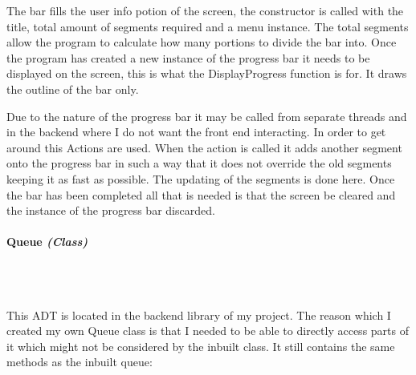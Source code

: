 \begin{FlushLeft}
    The bar fills the user info potion of the screen, the constructor is called with the title, total amount of segments required and a menu instance. The total segments allow the program to calculate how many portions to divide the bar into. Once the program has created a new instance of the progress bar it needs to be displayed on the screen, this is what the DisplayProgress function is for. It draws the outline of the bar only. \\ \bk

    Due to the nature of the progress bar it may be called from separate threads and in the backend where I do not want the front end interacting. In order to get around this Actions are used. When the action is called it adds another segment onto the progress bar in such a way that it does not override the old segments keeping it as fast as possible. The updating of the segments is done here. Once the bar has been completed all that is needed is that the screen be cleared and the instance of the progress bar discarded. \\ 
    \bk

    \pagebreak
\paragraph{Queue \textit{(Class)}} \mbox{} \\

    \begin{figure}[H]
        \centering
    \end{figure}\\

    This ADT is located in the backend library of my project. The reason which I created my own Queue class is that I needed to be able to directly access parts of it which might not be considered by the inbuilt class. It still contains the same methods as the inbuilt queue:\\ \bk


\end{FlushLeft}
